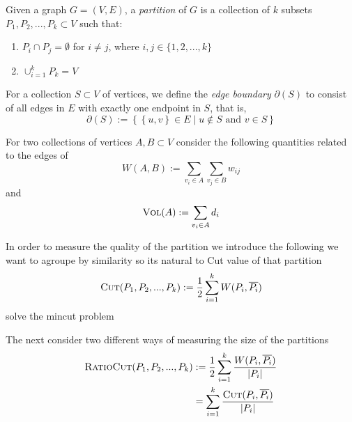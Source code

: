 
\begin{definition}
	Given a graph $G = (V, E)$, a \textit{partition } of $G$ is a collection of $k$ subsets $P_1, P_2, ..., P_k\subset V$ such that:
	\begin{enumerate}
		\item $P_i \cap P_j = \emptyset$ for $i\neq j$, where $i,j\in \{1,2,...,k\}$
		\item $\cup_{i=1}^k P_k = V$
	\end{enumerate}	 
\end{definition}

	For a collection $S\subset V$ of vertices, we define the \textit{edge boundary} $\partial(S)$ to consist of all edges in $E$ with exactly one endpoint in $S$, that is,
	\begin{displaymath}
		\partial(S) := \left\{ \left\{u, v\right\}  \in E \mid u \notin S \text{ and } v\in S \right\}
	\end{displaymath}

	For two collections of vertices $A, B\subset V$ consider the following quantities related to the edges of 
	\begin{displaymath}
		W(A,B) := \sum_{v_i\in A}\sum_{v_j \in B}w_{ij}
	\end{displaymath}
	and
	\begin{displaymath}
		\textsc{Vol}(A) :=  \sum_{v_i \in A} d_i 
	\end{displaymath}

In order to measure the quality of the partition we introduce the following 
we want to agroupe by similarity so its natural to 
Cut value of that partition
\begin{displaymath}
	\textsc{Cut}(P_1, P_2, ..., P_k) := \frac{1}{2} \sum_{i=1}^k W(P_i, \overline{P_i})
\end{displaymath}
solve the mincut problem

The next consider two different ways of measuring the size of the partitions
\begin{align*}
	\textsc{RatioCut}(P_1, P_2, ..., P_k) &:= \frac{1}{2} \sum_{i=1}^k \frac{W(P_i, \overline{P_i})}{\left| P_i \right|} \\
	&= \sum_{i=1}^k \frac{\textsc{Cut}(P_i, \overline{P_i})}{\left| P_i \right|}
\end{align*}

